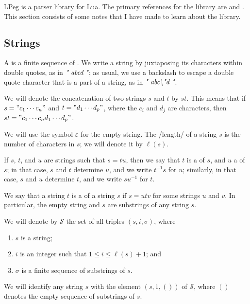 \documentclass{article}
\begin{document}
\textsf{LPeg} is a parser library for Lua.  The primary references for
the library are \textcite{bib:6whz1yt4} and \textcite{bib:rr7m3wo6}.
This section consists of some notes that I have made to learn about
the library.

\subsection{Strings}
\label{sec:hj8kx309}

A  is a finite sequence of .
We write a string by juxtaposing its characters within double quotes,
as in \(\text{\itshape" abcd "}\); as usual, we use a backslash to escape a double
quote character that is a part of a string, as in
\(\text{\itshape" abc\textbackslash"d "}\).

We will denote the concatenation of two strings \(s\) and \(t\) by
\(st\).  This means that if \(s = "c_1 \dotsm c_n"\) and
\(t = "d_1 \dotsm d_p"\), where the \(c_i\) and \(d_j\) are
characters, then \(st = "c_1 \dotsm c_n d_1 \dotsm d_p"\).

We will use the symbol \(\varepsilon\) for the empty string.  The
/length/ of a string \(s\) is the number of characters in \(s\); we
will denote it by \(\ell(s)\).

If \(s\), \(t\), and \(u\) are strings such that \(s = tu\), then we
say that \(t\) is a  of \(s\), and \(u\) a
 of \(s\); in that case, \(s\) and \(t\) determine
\(u\), and we write \(t^{-1}s\) for \(u\); similarly, in that case,
\(s\) and \(u\) determine \(t\), and we write \(su^{-1}\) for \(t\).

We say that a string \(t\) is a  of a string
\(s\) if \(s = utv\) for some strings \(u\) and \(v\).  In particular,
the empty string and \(s\) are substrings of any string \(s\).

We will denote by \(\mathcal{S}\) the set of all triples
\((s, i, \sigma)\), where
\begin{enumerate}
\item \(s\) is a string;
\item \(i\) is an integer such that \(1 \leq i \leq \ell(s) + 1\); and
\item \(\sigma\) is a finite sequence of substrings of \(s\).
\end{enumerate}
We will identify any string \(s\) with the element \((s, 1, ())\) of
\(\mathcal{S}\), where \(()\) denotes the empty sequence of substrings
of \(s.\)
\end{document}
